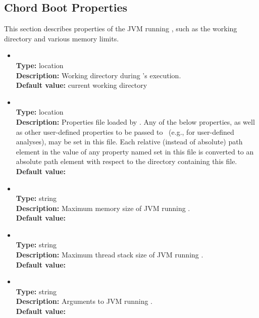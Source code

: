 \subsection{Chord Boot Properties}

This section describes properties of the JVM running \Chord, such as the working directory and various memory limits.
 
\begin{itemize}
\item
{} \\
{\bf Type:} location \\
{\bf Description:} Working directory during \Chord's execution. \\
{\bf Default value:} current working directory

\item
{} \\
{\bf Type:} location \\
{\bf Description:} Properties file loaded by .  Any of the below properties, as well as other user-defined properties to be passed to \Chord\ (e.g., for user-defined analyses), may be set in this file.  Each relative (instead of absolute) path element in the value of any property named  set in this file is converted to an absolute path element with respect to the directory containing this file. \\
{\bf Default value:}  

\item
{} \\
{\bf Type:} string \\
{\bf Description:} Maximum memory size of JVM running \Chord. \\
{\bf Default value:}  

\item 
{} \\
{\bf Type:} string \\
{\bf Description:} Maximum thread stack size of JVM running \Chord. \\
{\bf Default value:}  

\item
{} \\
{\bf Type:} string \\
{\bf Description:} Arguments to JVM running \Chord. \\
{\bf Default value:}    


\end{itemize}
